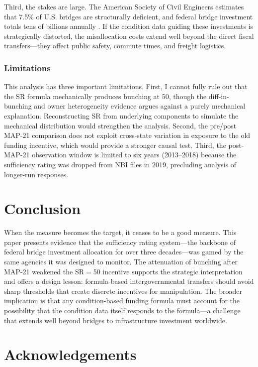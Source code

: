 \documentclass[12pt]{article}
\begin{document}
Third, the stakes are large. The American Society of Civil Engineers estimates that 7.5\% of U.S. bridges are structurally deficient, and federal bridge investment totals tens of billions annually \citep{asce2021infrastructure}. If the condition data guiding these investments is strategically distorted, the misallocation costs extend well beyond the direct fiscal transfers---they affect public safety, commute times, and freight logistics.

\subsubsection*{Limitations} This analysis has three important limitations. First, I cannot fully rule out that the SR formula mechanically produces bunching at 50, though the diff-in-bunching and owner heterogeneity evidence argues against a purely mechanical explanation. Reconstructing SR from underlying components to simulate the mechanical distribution would strengthen the analysis. Second, the pre/post MAP-21 comparison does not exploit cross-state variation in exposure to the old funding incentive, which would provide a stronger causal test. Third, the post-MAP-21 observation window is limited to six years (2013--2018) because the sufficiency rating was dropped from NBI files in 2019, precluding analysis of longer-run responses.

\section{Conclusion}

When the measure becomes the target, it ceases to be a good measure. This paper presents evidence that the sufficiency rating system---the backbone of federal bridge investment allocation for over three decades---was gamed by the same agencies it was designed to monitor. The attenuation of bunching after MAP-21 weakened the SR$=$50 incentive supports the strategic interpretation and offers a design lesson: formula-based intergovernmental transfers should avoid sharp thresholds that create discrete incentives for manipulation. The broader implication is that any condition-based funding formula must account for the possibility that the condition data itself responds to the formula---a challenge that extends well beyond bridges to infrastructure investment worldwide.

\section*{Acknowledgements}
\end{document}
